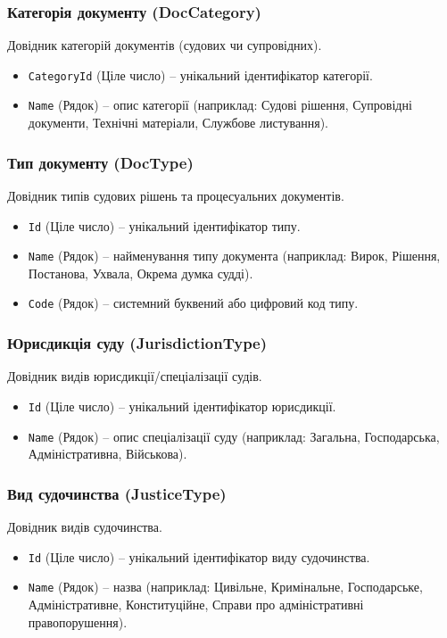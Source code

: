\documentclass{article}
\begin{document}
\subsubsection{Категорія документу (DocCategory)}
Довідник категорій документів (судових чи супровідних).
\begin{itemize}
    \item \texttt{CategoryId} (Ціле число) -- унікальний ідентифікатор категорії.
    \item \texttt{Name} (Рядок) -- опис категорії (наприклад: Судові рішення, Супровідні документи, Технічні матеріали, Службове листування).
\end{itemize}

\subsubsection{Тип документу (DocType)}
Довідник типів судових рішень та процесуальних документів.
\begin{itemize}
    \item \texttt{Id} (Ціле число) -- унікальний ідентифікатор типу.
    \item \texttt{Name} (Рядок) -- найменування типу документа (наприклад: Вирок, Рішення, Постанова, Ухвала, Окрема думка судді).
    \item \texttt{Code} (Рядок) -- системний буквений або цифровий код типу.
\end{itemize}

\subsubsection{Юрисдикція суду (JurisdictionType)}
Довідник видів юрисдикції/спеціалізації судів.
\begin{itemize}
    \item \texttt{Id} (Ціле число) -- унікальний ідентифікатор юрисдикції.
    \item \texttt{Name} (Рядок) -- опис спеціалізації суду (наприклад: Загальна, Господарська, Адміністративна, Військова).
\end{itemize}

\subsubsection{Вид судочинства (JusticeType)}
Довідник видів судочинства.
\begin{itemize}
    \item \texttt{Id} (Ціле число) -- унікальний ідентифікатор виду судочинства.
    \item \texttt{Name} (Рядок) -- назва (наприклад: Цивільне, Кримінальне, Господарське, Адміністративне, Конституційне, Справи про адміністративні правопорушення).
\end{itemize}
\end{document}
